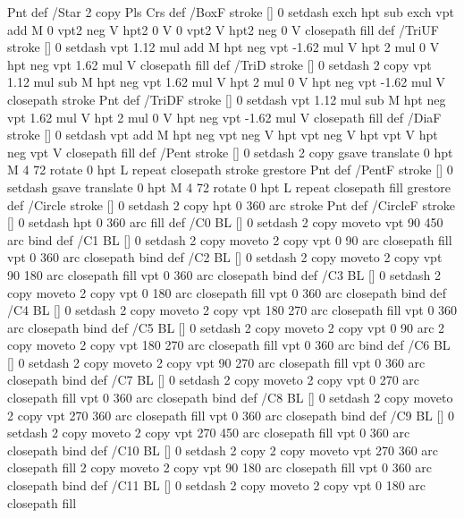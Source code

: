 {{{  Pnt  } def
/Star { 2 copy Pls Crs } def
/BoxF { stroke [] 0 setdash exch hpt sub exch vpt add M
  0 vpt2 neg V  hpt2 0 V  0 vpt2 V
  hpt2 neg 0 V  closepath fill } def
/TriUF { stroke [] 0 setdash vpt 1.12 mul add M
  hpt neg vpt -1.62 mul V
  hpt 2 mul 0 V
  hpt neg vpt 1.62 mul V closepath fill } def
/TriD { stroke [] 0 setdash 2 copy vpt 1.12 mul sub M
  hpt neg vpt 1.62 mul V
  hpt 2 mul 0 V
  hpt neg vpt -1.62 mul V closepath stroke
  Pnt  } def
/TriDF { stroke [] 0 setdash vpt 1.12 mul sub M
  hpt neg vpt 1.62 mul V
  hpt 2 mul 0 V
  hpt neg vpt -1.62 mul V closepath fill} def
/DiaF { stroke [] 0 setdash vpt add M
  hpt neg vpt neg V hpt vpt neg V
  hpt vpt V hpt neg vpt V closepath fill } def
/Pent { stroke [] 0 setdash 2 copy gsave
  translate 0 hpt M 4 {72 rotate 0 hpt L} repeat
  closepath stroke grestore Pnt } def
/PentF { stroke [] 0 setdash gsave
  translate 0 hpt M 4 {72 rotate 0 hpt L} repeat
  closepath fill grestore } def
/Circle { stroke [] 0 setdash 2 copy
  hpt 0 360 arc stroke Pnt } def
/CircleF { stroke [] 0 setdash hpt 0 360 arc fill } def
/C0 { BL [] 0 setdash 2 copy moveto vpt 90 450  arc } bind def
/C1 { BL [] 0 setdash 2 copy        moveto
       2 copy  vpt 0 90 arc closepath fill
               vpt 0 360 arc closepath } bind def
/C2 { BL [] 0 setdash 2 copy moveto
       2 copy  vpt 90 180 arc closepath fill
               vpt 0 360 arc closepath } bind def
/C3 { BL [] 0 setdash 2 copy moveto
       2 copy  vpt 0 180 arc closepath fill
               vpt 0 360 arc closepath } bind def
/C4 { BL [] 0 setdash 2 copy moveto
       2 copy  vpt 180 270 arc closepath fill
               vpt 0 360 arc closepath } bind def
/C5 { BL [] 0 setdash 2 copy moveto
       2 copy  vpt 0 90 arc
       2 copy moveto
       2 copy  vpt 180 270 arc closepath fill
               vpt 0 360 arc } bind def
/C6 { BL [] 0 setdash 2 copy moveto
      2 copy  vpt 90 270 arc closepath fill
              vpt 0 360 arc closepath } bind def
/C7 { BL [] 0 setdash 2 copy moveto
      2 copy  vpt 0 270 arc closepath fill
              vpt 0 360 arc closepath } bind def
/C8 { BL [] 0 setdash 2 copy moveto
      2 copy vpt 270 360 arc closepath fill
              vpt 0 360 arc closepath } bind def
/C9 { BL [] 0 setdash 2 copy moveto
      2 copy  vpt 270 450 arc closepath fill
              vpt 0 360 arc closepath } bind def
/C10 { BL [] 0 setdash 2 copy 2 copy moveto vpt 270 360 arc closepath fill
       2 copy moveto
       2 copy vpt 90 180 arc closepath fill
               vpt 0 360 arc closepath } bind def
/C11 { BL [] 0 setdash 2 copy moveto
       2 copy  vpt 0 180 arc closepath fill
}}}
